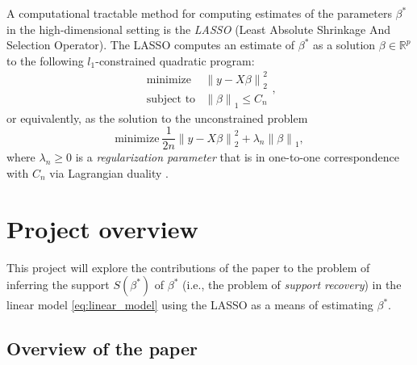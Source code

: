 \documentclass[letterpaper,12pt]{article}
\newcommand{\norm}[1]{\left\lVert#1\right\rVert}
\begin{document}
A computational tractable method for computing estimates of the
parameters $\beta^\ast$ in the high-dimensional setting is the
\textit{LASSO} \cite{tibshirani96} (Least Absolute Shrinkage And
Selection Operator). The LASSO computes an estimate of $\beta^\ast$ as
a solution $\beta \in \mathbb{R}^p$ to the following $l_1$-constrained
quadratic program:
\begin{equation} \label{eq:constrained_problem}
  \begin{array}{ll}
    \text{minimize} & \norm{y - X\beta}_2^2 \\
    \text{subject to}
      & \norm{\beta}_1 \leq C_n
  \end{array},
\end{equation}
or equivalently, as the solution to the unconstrained problem
\begin{equation} \label{eq:unconstrained_problem}
  \text{minimize} \
    \frac{1}{2n} \norm{y - X\beta}_2^2 + \lambda_n \norm{\beta}_1,
\end{equation}
where $\lambda_n \geq 0$ is a \textit{regularization parameter} that
is in one-to-one correspondence with $C_n$ via Lagrangian duality
\cite{wainwright06}.

\section*{Project overview}

This project will explore the contributions of the paper
\cite{wainwright06} to the problem of inferring the support
$S(\beta^\ast)$ of $\beta^\ast$ (i.e., the problem of \textit{support
  recovery}) in the linear model \eqref{eq:linear_model} using the
LASSO as a means of estimating $\beta^\ast$.

\subsection*{Overview of the paper}
\end{document}
